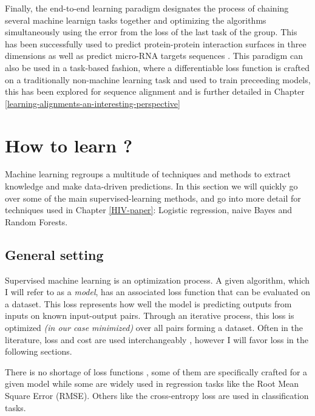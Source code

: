 \documentclass[
  11pt,
  twoside,
  BCOR=10mm,
  listof=totoc]{scrbook}
\begin{document}
Finally, the end-to-end learning paradigm designates the process of chaining several machine learnign tasks together and optimizing the algorithms simultaneously using the error from the loss of the last task of the group. This has been successfully used to predict protein-protein interaction surfaces in three dimensions \autocite{townshendEndtoEndLearning3D2019} as well as predict micro-RNA targets sequences \autocite{leeDeepTargetEndtoendLearning2016}. This paradigm can also be used in a task-based fashion, where a differentiable loss function is crafted on a traditionally non-machine learning task and used to train preceeding models, this has been explored for sequence alignment and is further detailed in Chapter \ref{learning-alignments-an-interesting-perspective}

\hypertarget{how-to-learn}{%
\section{How to learn ?}\label{how-to-learn}}

Machine learning regroups a multitude of techniques and methods to extract knowledge and make data-driven predictions. In this section we will quickly go over some of the main supervised-learning methods, and go into more detail for techniques used in Chapter \ref{HIV-paper}: Logistic regression, naive Bayes and Random Forests.

\hypertarget{general-setting}{%
\subsection{General setting}\label{general-setting}}

Supervised machine learning is an optimization process. A given algorithm, which I will refer to as a \emph{model}, has an associated loss function that can be evaluated on a dataset. This loss represents how well the model is predicting outputs from inputs on known input-output pairs. Through an iterative process, this loss is optimized \emph{(in our case minimized)} over all pairs forming a dataset. Often in the literature, loss and cost are used interchangeably \autocite{Goodfellow-et-al-2016}, however I will favor loss in the following sections.

There is no shortage of loss functions \autocite{wangComprehensiveSurveyLoss2022}, some of them are specifically crafted for a given model while some are widely used in regression tasks like the Root Mean Square Error (RMSE). Others like the cross-entropy loss are used in classification tasks.
\end{document}
